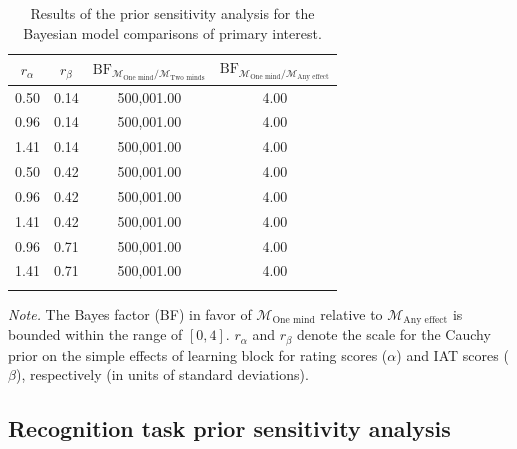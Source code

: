 \documentclass[
  doc]{apa6}
\begin{document}
\begin{table}[tbp]

\begin{center}
\begin{threeparttable}

\caption{\label{tab:otm1-prior-sensitivity-replication-table}Results of the prior sensitivity analysis for the Bayesian model comparisons of primary interest.}

\begin{tabular}{cccc}
\toprule
$r_\alpha$ & \multicolumn{1}{c}{$r_\beta$} & \multicolumn{1}{c}{$\textrm{BF}_{\mathcal{M}_\textrm{One mind}/\mathcal{M}_\textrm{Two minds}}$} & \multicolumn{1}{c}{$\textrm{BF}_{\mathcal{M}_\textrm{One mind}/\mathcal{M}_\textrm{Any effect}}$}\\
\midrule
0.50 & 0.14 & 500,001.00 & 4.00\\
0.96 & 0.14 & 500,001.00 & 4.00\\
1.41 & 0.14 & 500,001.00 & 4.00\\
0.50 & 0.42 & 500,001.00 & 4.00\\
0.96 & 0.42 & 500,001.00 & 4.00\\
1.41 & 0.42 & 500,001.00 & 4.00\\
0.96 & 0.71 & 500,001.00 & 4.00\\
1.41 & 0.71 & 500,001.00 & 4.00\\
\bottomrule
\addlinespace
\end{tabular}

\begin{tablenotes}[para]
\normalsize{\textit{Note.} The Bayes factor (BF) in favor of \(\mathcal{M}_\textrm{One mind}\) relative to \(\mathcal{M}_\textrm{Any effect}\) is bounded within the range of \([0, 4]\).
\(r_\alpha\) and \(r_\beta\) denote the scale for the Cauchy prior on the simple effects of learning block for rating scores (\(\alpha\)) and IAT scores (\(\beta\)), respectively (in units of standard deviations).}
\end{tablenotes}

\end{threeparttable}
\end{center}

\end{table}

\hypertarget{recognition-task-prior-sensitivity-analysis}{%
\subsection{Recognition task prior sensitivity analysis}\label{recognition-task-prior-sensitivity-analysis}}
\end{document}
